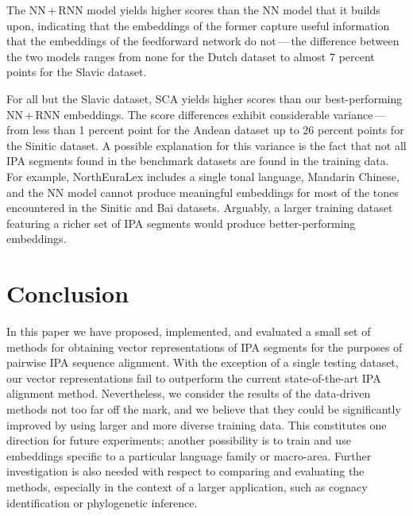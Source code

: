 \documentclass[a4paper]{report}
\begin{document}
The NN\,+\,RNN model yields higher scores than the NN model that it builds upon,
indicating that the embeddings of the former capture useful information that the embeddings of the feedforward network do not\,---\,the
difference between the two models ranges from none for the Dutch dataset to almost 7 percent points for the Slavic dataset.

For all but the Slavic dataset, SCA yields higher scores than our best-performing NN\,+\,RNN embeddings.
The score differences exhibit considerable variance\,---\,from less than 1 percent point for the Andean dataset up to 26 percent points for the Sinitic dataset.
A possible explanation for this variance is the fact that not all IPA segments found in the benchmark datasets are found in the training data.
For example, NorthEuraLex includes a single tonal language, Mandarin Chinese,
and the NN model cannot produce meaningful embeddings for most of the tones encountered in the Sinitic and Bai datasets.
Arguably, a larger training dataset featuring a richer set of IPA segments would produce better-performing embeddings.


\chapter{Conclusion}

In this paper we have proposed, implemented, and evaluated a small set of methods for obtaining vector representations of IPA segments
for the purposes of pairwise IPA sequence alignment.
With the exception of a single testing dataset, our vector representations fail to outperform the current state-of-the-art IPA alignment method.
Nevertheless, we consider the results of the data-driven methods not too far off the mark,
and we believe that they could be significantly improved by using larger and more diverse training data.
This constitutes one direction for future experiments;
another possibility is to train and use embeddings specific to a particular language family or macro-area.
Further investigation is also needed with respect to comparing and evaluating the methods,
especially in the context of a larger application, such as cognacy identification or phylogenetic inference.



\end{document}
